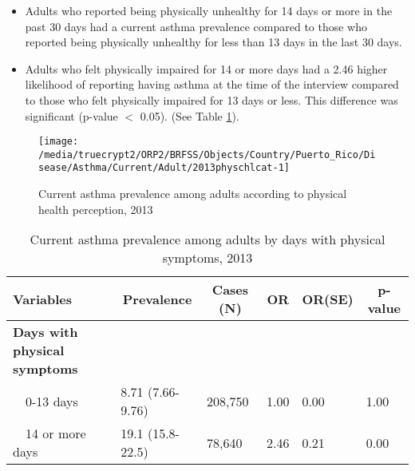  
\newpage

 \newpage
\begin{itemize}

\item Adults who reported being physically unhealthy for 14 days or more in the past 30 days had a  
 current asthma prevalence compared to those who reported being physically unhealthy for less than 13 days in the last 30 days.


\item Adults who felt physically impaired for 14 or more days had a 2.46 higher likelihood of reporting having asthma at the time of the interview compared to those who felt physically impaired for 13 days or less. This difference was significant (p-value $<$ 0.05). (See Table \ref{tab:phys.Asthma.2013}).

\end{itemize}

\begin{figure}[H]
\caption{Current asthma prevalence among adults according to physical health perception, 2013}
\label{fig:phys.Asthma.2013}
\begin{knitrout}
\color{fgcolor}

{\centering \texttt{[image: /media/truecrypt2/ORP2/BRFSS/Objects/Country/Puerto\_Rico/Disease/Asthma/Current/Adult/2013physchlcat-1]} 

}



\end{knitrout}
 \end{figure}

\begin{table}[H]
\caption{Current asthma prevalence among adults by days with physical symptoms, 2013\label{tab:phys.Asthma.2013}} 
\begin{center}
\begin{tabular}{llllll}
\hline\hline
\multicolumn{1}{l}{Variables}&\multicolumn{1}{c}{Prevalence}&\multicolumn{1}{c}{Cases (N)}&\multicolumn{1}{c}{OR}&\multicolumn{1}{c}{OR(SE)}&\multicolumn{1}{c}{p-value}\tabularnewline
\hline
{\bfseries Days with physical symptoms}&&&&&\tabularnewline
~~0-13 days&8.71 (7.66-9.76)&208,750&1.00&0.00&1.00\tabularnewline
~~14 or more days&19.1 (15.8-22.5)& 78,640&2.46&0.21&0.00\tabularnewline
\hline
\end{tabular}\end{center}

\end{table}


